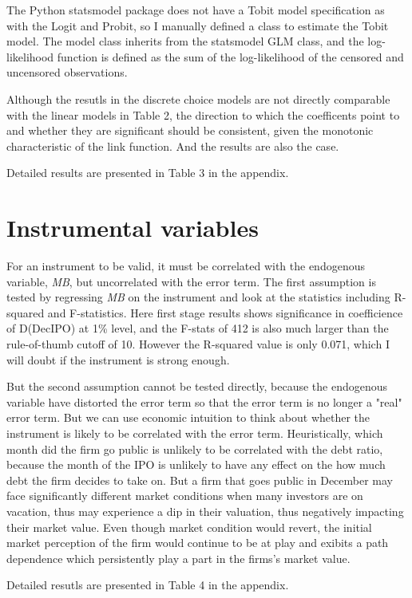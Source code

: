\documentclass{article}
\begin{document}
The Python statsmodel package does not have a Tobit model specification as with the Logit and Probit, so I manually defined a class to estimate the Tobit model.
The model class inherits from the statsmodel GLM class, and the log-likelihood function is defined as the sum of the log-likelihood of the
censored and uncensored observations.

Although the resutls in the discrete choice models are not directly comparable with the linear models in Table 2,
the direction to which the coefficents point to and whether they are significant should be consistent, given the monotonic characteristic of the link function.
And the results are also the case.

Detailed results are presented in Table 3 in the appendix.

\section*{Instrumental variables}
For an instrument to be valid, it must be correlated with the endogenous variable, \textit{MB},
but uncorrelated with the error term. The first assumption is tested by regressing \textit{MB} on the instrument and look at the statistics
including R-squared and F-statistics. Here first stage results shows significance in coefficience of D(DecIPO) at 1\% level, and the
F-stats of 412 is also much larger than the rule-of-thumb cutoff of 10. However the R-squared value is only 0.071, which I will doubt if
the instrument is strong enough.

But the second assumption cannot be tested directly, because the endogenous variable
have distorted the error term so that the error term is no longer a "real" error term.
But we can use economic intuition to think about whether the instrument is likely to be correlated with the error term.
Heuristically, which month did the firm go public is unlikely to be correlated with the debt ratio, because the month of the IPO
is unlikely to have any effect on the how much debt the firm decides to take on.
But a firm that goes public in December may face significantly different market conditions
when many investors are on vacation, thus may experience a dip in their valuation, thus negatively impacting
their market value. Even though market condition would revert, the initial market perception of the firm
would continue to be at play and exibits a path dependence which persistently play a part in the firms's market value.

Detailed resutls are presented in Table 4 in the appendix.
\end{document}
